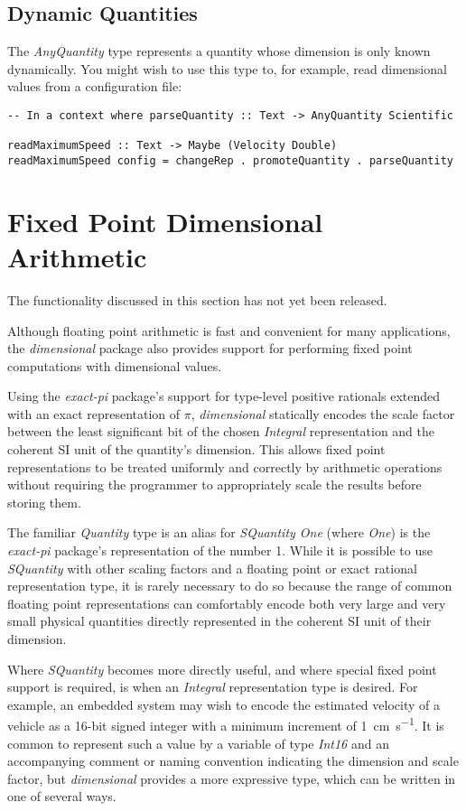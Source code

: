 \documentclass[11pt]{report}
\newcommand{\packagename}[1]{\textit{#1}}
\newcommand{\thispackage}{\packagename{dimensional}}
\newcommand{\classname}[1]{\textit{#1}}
\newcommand{\typename}[1]{\textit{#1}}
\newcommand{\prerelease}{\begin{framed}
The functionality discussed in this section has not yet been released.
\end{framed}}
\begin{document}
\section{Dynamic Quantities}

The \typename{AnyQuantity} type represents a quantity whose dimension is only known dynamically. You might wish to use this
type to, for example, read dimensional values from a configuration file:

\begin{lstlisting}
-- In a context where parseQuantity :: Text -> AnyQuantity Scientific

readMaximumSpeed :: Text -> Maybe (Velocity Double)
readMaximumSpeed config = changeRep . promoteQuantity . parseQuantity
\end{lstlisting}




\chapter{Fixed Point Dimensional Arithmetic}

\prerelease{}

Although floating point arithmetic is fast and convenient for many applications, the \thispackage{} package also provides
support for performing fixed point computations with dimensional values.

Using the \packagename{exact-pi} package's support for type-level positive rationals extended with an exact representation
of $ \pi $, \thispackage{} statically encodes the scale factor between the least significant bit of the chosen \classname{Integral}
representation and the coherent SI unit of the quantity's dimension. This allows fixed point representations to be
treated uniformly and correctly by arithmetic operations without requiring the programmer to appropriately scale the results
before storing them.

The familiar \typename{Quantity} type is an alias for \typename{SQuantity One} (where \typename{One}) is the \packagename{exact-pi}
package's representation of the number 1. While it is possible to use \typename{SQuantity} with other scaling factors and a
floating point or exact rational representation type, it is rarely necessary to do so because the range of common floating
point representations can comfortably encode both very large and very small physical quantities directly represented in the
coherent SI unit of their dimension.

Where \typename{SQuantity} becomes more directly useful, and where special fixed point support is required, is when an
\classname{Integral} representation type is desired. For example, an embedded system may wish to encode the estimated
velocity of a vehicle as a 16-bit signed integer with a minimum increment of \SI{1}{\centi\meter\per\second}. It is common
to represent such a value by a variable of type \typename{Int16} and an accompanying comment or naming convention indicating
the dimension and scale factor, but \thispackage{} provides a more expressive type, which can be written in one of several ways.
\end{document}
